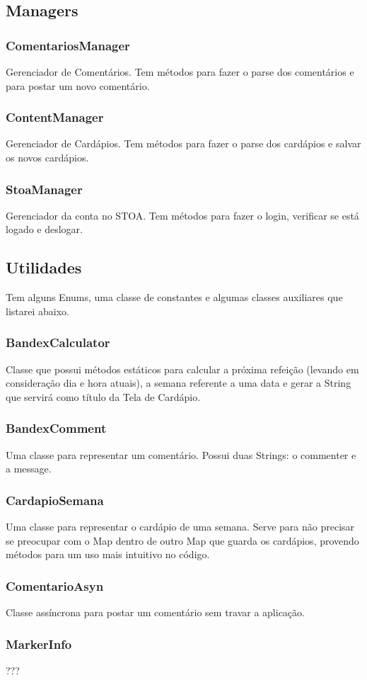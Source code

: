 \subsection{Managers}
\subsubsection{ComentariosManager}
Gerenciador de Comentários. Tem métodos para fazer o parse dos comentários e para postar um novo comentário.

\subsubsection{ContentManager}
Gerenciador de Cardápios. Tem métodos para fazer o parse dos cardápios e salvar os novos cardápios.

\subsubsection{StoaManager}
Gerenciador da conta no STOA. Tem métodos para fazer o login, verificar se está logado e deslogar.

\subsection{Utilidades}
Tem alguns Enums, uma classe de constantes e algumas classes auxiliares que listarei abaixo.
\subsubsection{BandexCalculator}
Classe que possui métodos estáticos para calcular a próxima refeição (levando em consideração dia e hora atuais), a semana referente a uma data e gerar a String que servirá como título da Tela de Cardápio.

\subsubsection{BandexComment}
Uma classe para representar um comentário. Possui duas Strings: o commenter e a message.

\subsubsection{CardapioSemana}
Uma classe para representar o cardápio de uma semana. Serve para não precisar se preocupar com o Map dentro de outro Map que guarda os cardápios, provendo métodos para um uso mais intuitivo no código.

\subsubsection{ComentarioAsyn}
Classe assíncrona para postar um comentário sem travar a aplicação.

\subsubsection{MarkerInfo}
???



